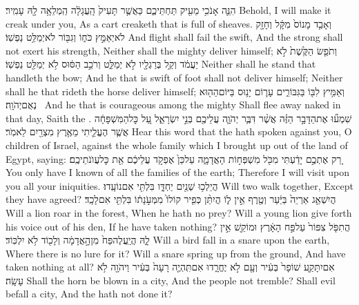 {הִנֵּ֛ה אָנֹכִ֥י מֵעִ֖יק תַּחְתֵּיכֶ֑ם כַּאֲשֶׁ֤ר תָּעִיק֙ הָֽעֲגָלָ֔ה הַֽמְלֵאָ֥ה לָ֖הּ עָמִֽיר׃}
{Behold, I will make it creak under you, As a cart creaketh that is full of sheaves.}
{וְאָבַ֤ד מָנוֹס֙ מִקָּ֔ל וְחָזָ֖ק לֹא\maqqaf יְאַמֵּ֣ץ כֹּח֑וֹ וְגִבּ֖וֹר לֹא\maqqaf יְמַלֵּ֥ט נַפְשֽׁוֹ׃}
{And flight shall fail the swift, And the strong shall not exert his strength, Neither shall the mighty deliver himself;}
{וְתֹפֵ֤שׂ הַקֶּ֙שֶׁת֙ לֹ֣א יַעֲמֹ֔ד וְקַ֥ל בְּרַגְלָ֖יו לֹ֣א יְמַלֵּ֑ט וְרֹכֵ֣ב הַסּ֔וּס לֹ֥א יְמַלֵּ֖ט נַפְשֽׁוֹ׃}
{Neither shall he stand that handleth the bow; And he that is swift of foot shall not deliver himself; Neither shall he that rideth the horse deliver himself;}
{וְאַמִּ֥יץ לִבּ֖וֹ בַּגִּבּוֹרִ֑ים עָר֛וֹם יָנ֥וּס בַּיּוֹם\maqqaf הַה֖וּא נְאֻם\maqqaf יְהֹוָֽה׃ \petucha }
{And he that is courageous among the mighty Shall flee away naked in that day, Saith the \lord.}
\newperek
{}
{שִׁמְע֞וּ אֶת\maqqaf הַדָּבָ֣ר הַזֶּ֗ה אֲשֶׁ֨ר דִּבֶּ֧ר יְהֹוָ֛ה עֲלֵיכֶ֖ם בְּנֵ֣י יִשְׂרָאֵ֑ל עַ֚ל כׇּל\maqqaf הַמִּשְׁפָּחָ֔ה אֲשֶׁ֧ר הֶעֱלֵ֛יתִי מֵאֶ֥רֶץ מִצְרַ֖יִם לֵאמֹֽר׃}
{Hear this word that the \lord\space hath spoken against you, O children of Israel, against the whole family which I brought up out of the land of Egypt, saying:}
{רַ֚ק אֶתְכֶ֣ם יָדַ֔עְתִּי מִכֹּ֖ל מִשְׁפְּח֣וֹת הָאֲדָמָ֑ה עַל\maqqaf כֵּן֙ אֶפְקֹ֣ד עֲלֵיכֶ֔ם אֵ֖ת כׇּל\maqqaf עֲוֺנֹתֵיכֶֽם׃}
{You only have I known of all the families of the earth; Therefore I will visit upon you all your iniquities.}
{הֲיֵלְכ֥וּ שְׁנַ֖יִם יַחְדָּ֑ו בִּלְתִּ֖י אִם\maqqaf נוֹעָֽדוּ׃}
{Will two walk together, Except they have agreed?}
{הֲיִשְׁאַ֤ג אַרְיֵה֙ בַּיַּ֔עַר וְטֶ֖רֶף אֵ֣ין ל֑וֹ הֲיִתֵּ֨ן כְּפִ֤יר קוֹלוֹ֙ מִמְּעֹ֣נָת֔וֹ בִּלְתִּ֖י אִם\maqqaf לָכָֽד׃}
{Will a lion roar in the forest, When he hath no prey? Will a young lion give forth his voice out of his den, If he have taken nothing?}
{הֲתִפֹּ֤ל צִפּוֹר֙ עַל\maqqaf פַּ֣ח הָאָ֔רֶץ וּמוֹקֵ֖שׁ אֵ֣ין לָ֑הּ הֲיַֽעֲלֶה\maqqaf פַּח֙ מִן\maqqaf הָ֣אֲדָמָ֔ה וְלָכ֖וֹד לֹ֥א יִלְכּֽוֹד׃}
{Will a bird fall in a snare upon the earth, Where there is no lure for it? Will a snare spring up from the ground, And have taken nothing at all?}
{אִם\maqqaf יִתָּקַ֤ע שׁוֹפָר֙ בְּעִ֔יר וְעָ֖ם לֹ֣א יֶחֱרָ֑דוּ אִם\maqqaf תִּֽהְיֶ֤ה רָעָה֙ בְּעִ֔יר וַיהֹוָ֖ה לֹ֥א עָשָֽׂה׃}
{Shall the horn be blown in a city, And the people not tremble? Shall evil befall a city, And the \lord\space hath not done it?}
